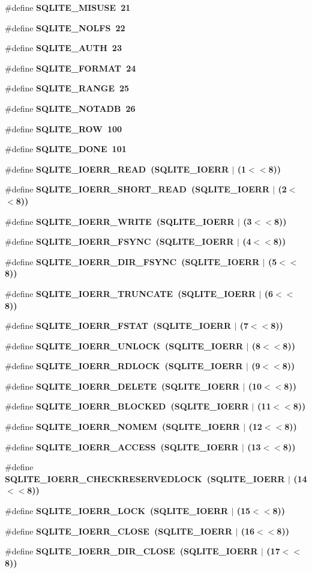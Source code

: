 \begin{CompactItemize}
\#define \bf{SQLITE\_\-MISUSE}~21
\item 
\#define \bf{SQLITE\_\-NOLFS}~22
\item 
\#define \bf{SQLITE\_\-AUTH}~23
\item 
\#define \bf{SQLITE\_\-FORMAT}~24
\item 
\#define \bf{SQLITE\_\-RANGE}~25
\item 
\#define \bf{SQLITE\_\-NOTADB}~26
\item 
\#define \bf{SQLITE\_\-ROW}~100
\item 
\#define \bf{SQLITE\_\-DONE}~101
\item 
\#define \bf{SQLITE\_\-IOERR\_\-READ}~(SQLITE\_\-IOERR $|$ (1$<$$<$8))
\item 
\#define \bf{SQLITE\_\-IOERR\_\-SHORT\_\-READ}~(SQLITE\_\-IOERR $|$ (2$<$$<$8))
\item 
\#define \bf{SQLITE\_\-IOERR\_\-WRITE}~(SQLITE\_\-IOERR $|$ (3$<$$<$8))
\item 
\#define \bf{SQLITE\_\-IOERR\_\-FSYNC}~(SQLITE\_\-IOERR $|$ (4$<$$<$8))
\item 
\#define \bf{SQLITE\_\-IOERR\_\-DIR\_\-FSYNC}~(SQLITE\_\-IOERR $|$ (5$<$$<$8))
\item 
\#define \bf{SQLITE\_\-IOERR\_\-TRUNCATE}~(SQLITE\_\-IOERR $|$ (6$<$$<$8))
\item 
\#define \bf{SQLITE\_\-IOERR\_\-FSTAT}~(SQLITE\_\-IOERR $|$ (7$<$$<$8))
\item 
\#define \bf{SQLITE\_\-IOERR\_\-UNLOCK}~(SQLITE\_\-IOERR $|$ (8$<$$<$8))
\item 
\#define \bf{SQLITE\_\-IOERR\_\-RDLOCK}~(SQLITE\_\-IOERR $|$ (9$<$$<$8))
\item 
\#define \bf{SQLITE\_\-IOERR\_\-DELETE}~(SQLITE\_\-IOERR $|$ (10$<$$<$8))
\item 
\#define \bf{SQLITE\_\-IOERR\_\-BLOCKED}~(SQLITE\_\-IOERR $|$ (11$<$$<$8))
\item 
\#define \bf{SQLITE\_\-IOERR\_\-NOMEM}~(SQLITE\_\-IOERR $|$ (12$<$$<$8))
\item 
\#define \bf{SQLITE\_\-IOERR\_\-ACCESS}~(SQLITE\_\-IOERR $|$ (13$<$$<$8))
\item 
\#define \bf{SQLITE\_\-IOERR\_\-CHECKRESERVEDLOCK}~(SQLITE\_\-IOERR $|$ (14$<$$<$8))
\item 
\#define \bf{SQLITE\_\-IOERR\_\-LOCK}~(SQLITE\_\-IOERR $|$ (15$<$$<$8))
\item 
\#define \bf{SQLITE\_\-IOERR\_\-CLOSE}~(SQLITE\_\-IOERR $|$ (16$<$$<$8))
\item 
\#define \bf{SQLITE\_\-IOERR\_\-DIR\_\-CLOSE}~(SQLITE\_\-IOERR $|$ (17$<$$<$8))
$$
\end{CompactItemize}
